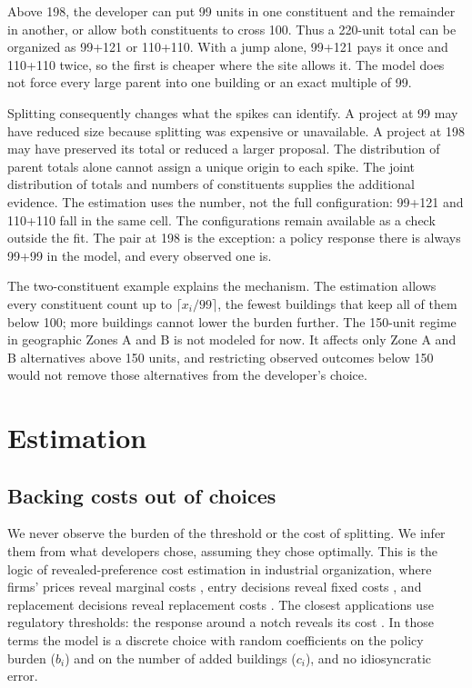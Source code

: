 \documentclass[11pt]{article}
\begin{document}
Above 198, the developer can put 99 units in one constituent and the remainder in another, or allow both constituents to cross 100. Thus a 220-unit total can be organized as 99+121 or 110+110. With a jump alone, 99+121 pays it once and 110+110 twice, so the first is cheaper where the site allows it. The model does not force every large parent into one building or an exact multiple of 99.

Splitting consequently changes what the spikes can identify. A project at 99 may have reduced size because splitting was expensive or unavailable. A project at 198 may have preserved its total or reduced a larger proposal. The distribution of parent totals alone cannot assign a unique origin to each spike. The joint distribution of totals and numbers of constituents supplies the additional evidence. The estimation uses the number, not the full configuration: 99+121 and 110+110 fall in the same cell. The configurations remain available as a check outside the fit. The pair at 198 is the exception: a policy response there is always 99+99 in the model, and every observed one is.

The two-constituent example explains the mechanism. The estimation allows every constituent count up to $\lceil x_i/99\rceil$, the fewest buildings that keep all of them below 100; more buildings cannot lower the burden further. The 150-unit regime in geographic Zones A and B is not modeled for now. It affects only Zone A and B alternatives above 150 units, and restricting observed outcomes below 150 would not remove those alternatives from the developer's choice.

\section{Estimation}

\subsection{Backing costs out of choices}

We never observe the burden of the threshold or the cost of splitting. We infer them from what developers chose, assuming they chose optimally. This is the logic of revealed-preference cost estimation in industrial organization, where firms' prices reveal marginal costs \citep{blp1995}, entry decisions reveal fixed costs \citep{bresnahanreiss1991}, and replacement decisions reveal replacement costs \citep{rust1987}. The closest applications use regulatory thresholds: the response around a notch reveals its cost \citep{klevenwaseem2013,garicano2016}. In those terms the model is a discrete choice with random coefficients on the policy burden ($b_i$) and on the number of added buildings ($c_i$), and no idiosyncratic error.
\end{document}
